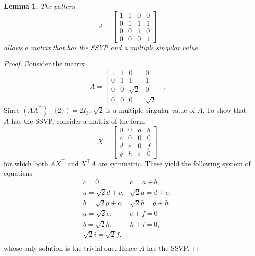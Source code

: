 \documentclass[preprint,12pt]{elsarticle}
\newcommand{\trans  }{^\top}
\newtheorem{lemma}[theorem]{Lemma}
\begin{document}
\begin{lemma}
\rm
\label{inout}
The pattern
\[ A=\left[\begin{array}{rrrr}
1 & 1 & 0 & 0 \\
0 & 1 & 1 & 1 \\
0 & 0 & 1 & 0 \\
0 & 0 & 0 & 1
\end{array}\right]
\]
allows a matrix that has the SSVP and a multiple singular value. 
\end{lemma}

\begin{proof}
Consider the matrix
\[ A=\left[\begin{array}{rrrr}
1 & 1 & 0 & 0 \\
0 & 1 & 1 & 1 \\
0 & 0 & \sqrt{2} & 0 \\
0 & 0 & 0 & \sqrt{2}
\end{array}\right].
\] 
Since $(AA\trans)(\{2\})=2I_3$, $\sqrt{2}$ is a multiple singular value of $A$. To show that $A$ has the SSVP, consider a matrix of the form 
\[ 
X=\left[\begin{array}{rrrr}
0 & 0 & a & b \\
c & 0 & 0 & 0 \\
d & e & 0 & f \\
g & h & i & 0
\end{array}\right]
\]
for which both $AX\trans$ and $X\trans A$ are symmetric. 
These yield the following system of equations
\[ 
\begin{array}{lllll}
c = 0,&   c = a+b, \\
 a= \sqrt{2}d+c, & \sqrt{2}a=d+e,\\
 b=\sqrt{2}g+c, & \sqrt{2}b=g+h\\
 a= \sqrt{2}e, & e+f=0\\
 b= \sqrt{2}h, & h+i=0, \\ 
 \sqrt{2}i=\sqrt{2}f. \\
\end{array}
\] 
whose only solution is the trivial one.  Hence $A$ has the SSVP.
\end{proof}
\end{document}
